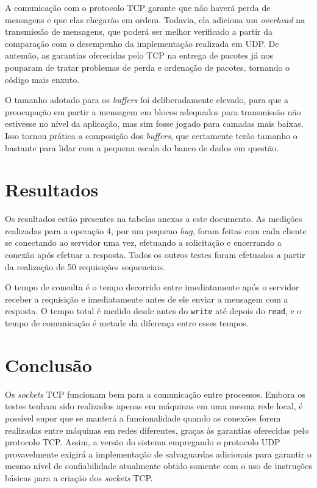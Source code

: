 \documentclass[11pt, brazil]{article} %
\begin{document}
A comunicação com o protocolo TCP garante que não haverá perda de mensagens e que elas chegarão em ordem. 
Todavia, ela adiciona um \emph{overhead} na transmissão de mensagens, que poderá ser melhor verificado a partir da comparação com o desempenho da implementação realizada em UDP. 
De antemão, as garantias oferecidas pelo TCP na entrega de pacotes já nos pouparam de tratar problemas de perda e ordenação de pacotes, tornando o código mais enxuto.

O tamanho adotado para os \emph{buffers} foi deliberadamente elevado, para que a preocupação em partir a mensagem em blocos adequados para transmissão não estivesse no nível da aplicação, mas sim fosse jogado para camadas mais baixas. Isso tornou prática a composição dos \emph{buffers}, que certamente terão tamanho o bastante para lidar com a pequena escala do banco de dados em questão.

\section{Resultados}

Os resultados estão presentes na tabelas anexas a este documento. As medições realizadas para a operação 4, por um pequeno \emph{bug}, foram feitas com cada cliente se conectando ao servidor uma vez, efetuando a solicitação e encerrando a conexão após efetuar a resposta. Todos os outros testes foram efetuados a partir da realização de 50 requisições sequenciais.

O tempo de consulta é o tempo decorrido entre imediatamente após o servidor receber a requisição e imediatamente antes de ele enviar a mensagem com a resposta. O tempo total é medido desde antes do \texttt{write} até depois do \texttt{read}, e o tempo de comunicação é metade da diferença entre esses tempos.

\section{Conclusão}

Os \emph{sockets} TCP funcionam bem para a comunicação entre processos. Embora os testes tenham sido realizados apenas em máquinas em uma mesma rede local, é possível supor que se manterá a funcionalidade quando as conexões forem realizadas entre máquinas em redes diferentes, graças às garantias oferecidas pelo protocolo TCP. 
Assim, a versão do sistema empregando o protocolo UDP provavelmente exigirá a implementação de salvaguardas adicionais para garantir o mesmo nível de confiabilidade atualmente obtido somente com o uso de instruções básicas para a criação dos \emph{sockets} TCP.
\end{document}
